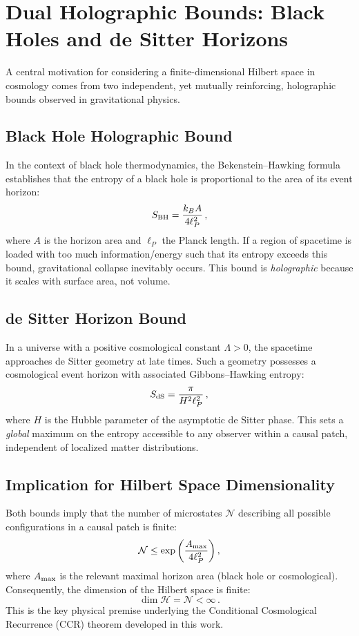 \documentclass[12pt]{article}
\theoremstyle{remark}
\begin{document}
\section{Dual Holographic Bounds: Black Holes and de Sitter Horizons}
A central motivation for considering a finite-dimensional Hilbert space in cosmology comes from two independent,
yet mutually reinforcing, holographic bounds observed in gravitational physics.

\subsection{Black Hole Holographic Bound}
In the context of black hole thermodynamics, the Bekenstein--Hawking formula establishes that the entropy of a black hole is proportional to the area of its event horizon:
\begin{equation}
S_{\rm BH} = \frac{k_B A}{4 \ell_P^2} \, ,
\end{equation}
where $A$ is the horizon area and $\ell_P$ the Planck length.
If a region of spacetime is loaded with too much information/energy such that its entropy exceeds this bound, gravitational collapse inevitably occurs.
This bound is \emph{holographic} because it scales with surface area, not volume.

\subsection{de Sitter Horizon Bound}
In a universe with a positive cosmological constant $\Lambda > 0$, the spacetime approaches de Sitter geometry at late times.
Such a geometry possesses a cosmological event horizon with associated Gibbons--Hawking entropy:
\begin{equation}
S_{\rm dS} = \frac{\pi}{H^2 \ell_P^2} \, ,
\end{equation}
where $H$ is the Hubble parameter of the asymptotic de Sitter phase.
This sets a \emph{global} maximum on the entropy accessible to any observer within a causal patch, independent of localized matter distributions.

\subsection{Implication for Hilbert Space Dimensionality}
Both bounds imply that the number of microstates $\mathcal{N}$ describing all possible configurations in a causal patch is finite:
\begin{equation}
\mathcal{N} \le \exp\left( \frac{A_{\rm max}}{4 \ell_P^2} \right) ,
\end{equation}
where $A_{\rm max}$ is the relevant maximal horizon area (black hole or cosmological).
Consequently, the dimension of the Hilbert space is finite:
\begin{equation}
\dim \mathcal{H} = \mathcal{N} < \infty \, .
\end{equation}
This is the key physical premise underlying the Conditional Cosmological Recurrence (CCR) theorem developed in this work.
\end{document}
